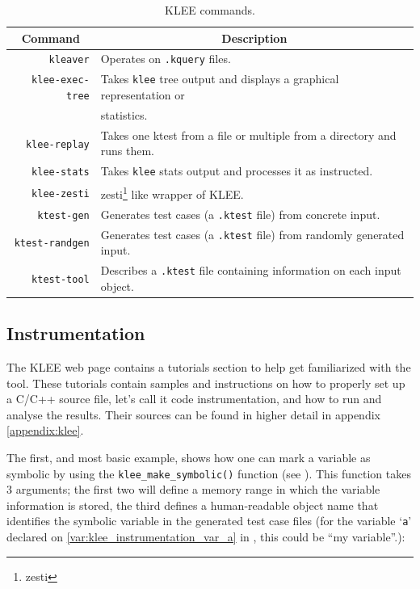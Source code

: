 \begin{table}[ht]
    \centering
    \begin{tabular}{r|l}
    \multicolumn{1}{c|}{Command} & \multicolumn{1}{c}{Description} \\
    \hline
    \hline
    \lstinline$kleaver$ & Operates on \lstinline$.kquery$ files. \\
    \lstinline$klee-exec-tree$ & Takes \lstinline$klee$ tree output and displays a graphical representation or \\&statistics.\\
    \lstinline$klee-replay$ & Takes one ktest from a file or multiple from a directory and runs them. \\
    \lstinline$klee-stats$ & Takes \lstinline$klee$ stats output and processes it as instructed. \\
    \lstinline$klee-zesti$ & \acrshort{zesti}\footnote{\acrfull{zesti}} like wrapper of KLEE. \\
    \lstinline$ktest-gen$ & Generates test cases (a \lstinline$.ktest$ file) from concrete input. \\
    \lstinline$ktest-randgen$ & Generates test cases (a \lstinline$.ktest$ file) from randomly generated input. \\
    \lstinline$ktest-tool$ & Describes a \lstinline$.ktest$ file containing information on each input object. \\
    \end{tabular}
    \caption{KLEE commands.}
    \label{tab:klee_features}
\end{table}

\subsection{Instrumentation}\label{subsection:klee_instrumentation}

The KLEE web page contains a tutorials section to help get familiarized with the tool. These tutorials contain samples and instructions on how to properly set up a C/C++ source file, let's call it code instrumentation, and how to run and analyse the results. Their sources can be found in higher detail in appendix \ref{appendix:klee}.

The first, and most basic example, shows how one can mark a variable as symbolic by using the \lstinline$klee_make_symbolic()$ function (see ). This function takes 3 arguments; the first two will define a memory range in which the variable information is stored, the third defines a human-readable object name that identifies the symbolic variable in the generated test case files (for the variable `\lstinline$a$' declared on \cref{var:klee_instrumentation_var_a} in , this could be ``my variable''.):

